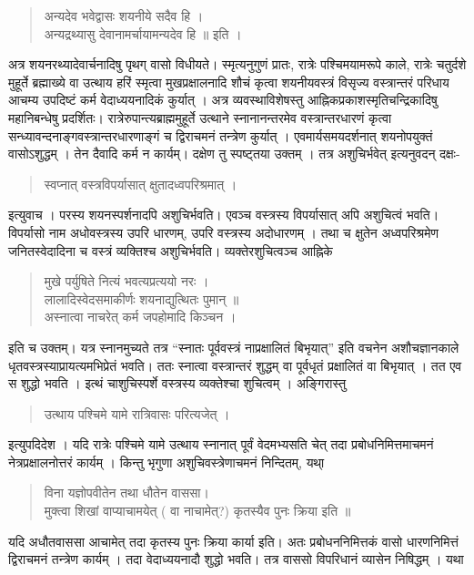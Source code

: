 {\begin{verse}
अन्यदेव भवेद्वासः शयनीये सदैव हि ।\\
अन्यद्रथ्यासु देवानामर्चायामन्यदेव हि ॥ इति ।
\end{verse}
अत्र शयनरथ्यादेवार्चनादिषु  पृथग् वासो विधीयते। स्मृत्यनुगुणं प्रातः, रात्रेः पश्चिमयामरूपे काले, रात्रेः चतुर्दशे मुहूर्ते ब्रह्माख्ये वा उत्थाय हरिं स्मृत्वा मुखप्रक्षालनादि शौचं कृत्वा शयनीयवस्त्रं विसृज्य वस्त्रान्तरं परिधाय आचम्य उपदिष्टं कर्म वेदाध्ययनादिकं कुर्यात् । अत्र व्यवस्थाविशेषस्तु आह्निकप्रकाशस्मृतिचन्द्रिकादिषु महानिबन्धेषु प्रदर्शितः। रात्रेरुपान्त्यब्राह्ममुहूर्ते उत्थाने स्नानानन्तरमेव वस्त्रान्तरधारणं कृत्वा सन्ध्यावन्दनाङ्गवस्त्रान्तरधारणाङ्गं च द्विराचमनं तन्त्रेण कुर्यात् । एवमार्यसमयदर्शनात् शयनोपयुक्तं वासोऽशुद्धम् । तेन दैवादि कर्म न कार्यम्। दक्षेण तु स्पष्ट्तया उक्तम् । तत्र अशुचिर्भवेत् इत्यनुवदन् दक्षः- 
\begin{verse}
स्वप्नात् वस्त्रविपर्यासात् क्षुतादध्वपरिश्रमात् । 
\end{verse}
इत्युवाच । परस्य शयनस्पर्शनादपि अशुचिर्भवति। एवञ्च वस्त्रस्य विपर्यासात् अपि अशुचित्वं भवति। विपर्यासो नाम अधोवस्त्रस्य उपरि धारणम्, उपरि वस्त्रस्य अदोधारणम् । तथा च क्षुतेन अध्वपरिश्रमेण जनितस्वेदादिना च वस्त्रं व्यक्तिश्च अशुचिर्भवति। व्यक्तेरशुचित्वञ्च आह्निके 
\begin{verse}
मुखे पर्युषिते नित्यं भवत्यप्रत्ययो नरः । \\
लालादिस्वेदसमाकीर्णः शयनाद्युत्थितः पुमान् ॥\\
अस्नात्वा नाचरेत् कर्म जपहोमादि किञ्चन ।
\end{verse}
इति च उक्तम्। यत्र स्नानमुच्यते तत्र “स्नातः पूर्ववस्त्रं नाप्रक्षालितं बिभृयात्” इति वचनेन अशौचज्ञानकाले धृतवस्त्रस्याप्रायत्यमभिप्रेतं भवति। ततः स्नात्वा वस्त्रान्तरं शुद्धम् वा पूर्वधृतं प्रक्षालितं वा बिभृयात् । तत एव स शुद्धो भवति । इत्थं चाशुचिस्पर्शे वस्त्रस्य व्यक्तेश्चा शुचित्वम् । अङ्गिरास्तु 
\begin{verse}
उत्थाय पश्चिमे यामे रात्रिवासः परित्यजेत्  ।
\end{verse}
इत्युपदिदेश । यदि रात्रेः पश्चिमे यामे उत्थाय स्नानात् पूर्वं वेदमभ्यसति चेत् तदा प्रबोधनिमित्तमाचमनं नेत्रप्रक्षालनोत्तरं कार्यम् । किन्तु भृगुणा अशुचिवस्त्रेणाचमनं निन्दितम्, यथा् \
\begin{verse}
विना यज्ञोपवीतेन तथा धौतेन वाससा। \\
मुक्त्वा शिखां वाप्याचामयेत् ( वा नाचामेत्?) कृतस्यैव पुनः क्रिया इति ॥ 
\end{verse}
यदि अधौतवाससा आचामेत् तदा कृतस्य पुनः क्रिया कार्या इति। अतः प्रबोधननिमित्तकं वासो धारणनिमित्तं द्विराचमनं तन्त्रेण कार्यम् । तदा वेदाध्ययनादौ शुद्धो भवति। तत्र वाससो विपरिधानं व्यासेन निषिद्धम् । यथा \
}
